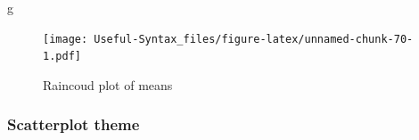 \documentclass[
]{article}
\newenvironment{Shaded}{\begin{snugshade}}{\end{snugshade}}
\newcommand{\NormalTok}[1]{#1}
\begin{document}
\begin{Shaded}
\begin{Highlighting}[]
\NormalTok{g}
\end{Highlighting}
\end{Shaded}

\begin{figure}
\centering
\texttt{[image: Useful-Syntax\_files/figure-latex/unnamed-chunk-70-1.pdf]}
\caption{\label{fig:unnamed-chunk-70}Raincoud plot of means}
\end{figure}

\hypertarget{scatterplot-theme}{%
\subsubsection{Scatterplot theme}\label{scatterplot-theme}}
\end{document}

